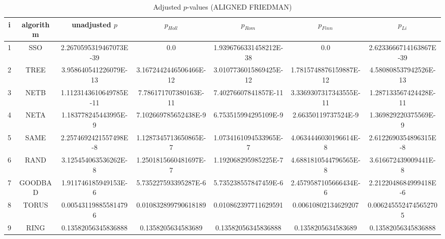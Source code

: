 \documentclass[a4paper,10pt]{article}
\begin{document}
\begin{landscape}
\begin{table}[!htp]
\centering\scriptsize
\caption{Adjusted $p$-values (ALIGNED FRIEDMAN)}
\begin{tabular}{ccccccc}
i&algorithm&unadjusted $p$&$p_{Holl}$&$p_{Rom}$&$p_{Finn}$&$p_{Li}$\\
\hline
1& SSO&2.2670595319467073E-39&0.0&1.9396766331458212E-38&0.0&2.6233666714163867E-39\\
2& TREE&3.958640541226079E-13&3.1672442446506466E-12&3.0107736015869425E-12&1.7815748876159887E-12&4.580808537942526E-13\\
3& NETB&1.1123143610649785E-11&7.786171707380163E-11&7.40276607841857E-11&3.3369307317343555E-11&1.287133567424428E-11\\
4& NETA&1.183778245443995E-9&7.102669785652438E-9&6.753515994295109E-9&2.66350119737524E-9&1.369829220375569E-9\\
5& SAME&2.2574692421557498E-8&1.1287345713650865E-7&1.0734161094533965E-7&4.0634446030196614E-8&2.6122690354896315E-8\\
6& RAND&3.125454063536262E-8&1.2501815660481697E-7&1.192068295985225E-7&4.6881810544796565E-8&3.616672439009441E-8\\
7& GOODBAD&1.911746185949153E-6&5.735227593395287E-6&5.735238557847459E-6&2.4579587105666434E-6&2.2122048684999418E-6\\
8& TORUS&0.005431198855814796&0.010832899790618189&0.010862397711629591&0.00610802134629207&0.0062455524745652705\\
9& RING&0.13582056345836888&0.1358205634583689&0.13582056345836888&0.1358205634583689&0.13582056345836888\\
\hline
\end{tabular}
\end{table}


\newpage


\end{landscape}
\end{document}
